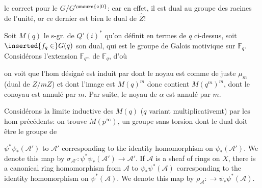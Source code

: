 

le  correct pour le $G/G^{\unsure{\circ|0}}$: car en effet, il est dual au groupe des racines de l'unité, or ce dernier est bien le dual de $\widehat Z$!


Soit $M(q)$ le s-gr. de $Q'(i)^*$ qu'on définit en termes de $q$ ci-dessus, soit  $\inserted{f_q\in}G(q)$ son dual, qui est le groupe de Galois motivique sur $\mathbb F_q$. Considérons l'extension $\mathbb F_{q^m}$ de $\mathbb F_q$, d'où


 on voit que l'hom désigné \unsure{$\alpha$} est induit par
dont le noyau est comme de juste  $\mu_m$ (dual de $Z/mZ$) et dont l'image est $M(q)^m$ donc contient $M(q^m)^m$, dont le conoyau est annulé par $m$. Par suite, le  noyau de $\alpha$ est annulé par $m$.

 Considérons la limite inductive des $M(q)$ ($q$ variant multiplicativemt) par les hom précédents: on trouve $M(p^\infty)$, un groupe sans torsion dont le dual doit être le groupe de



$\psi^*\psi_*(\mathcal A')$ to $\mathcal A'$ corresponding to the identity homomorphism on $\psi_*(\mathcal A')$. We denote this map by $\sigma_{\mathcal A'}:\psi^*\psi_*(\mathcal A')\to\mathcal A'$. If $\mathcal A$ is a sheaf of rings on $X$, there is a canonical ring homomorphism from $\mathcal A$ to $\psi_*\psi^*(\mathcal A)$ corresponding to the identity homomorphism on $\psi^*(\mathcal A)$. We denote this map by $\rho_{\mathcal A}:\to\psi_*\psi^*(\mathcal A)$.

